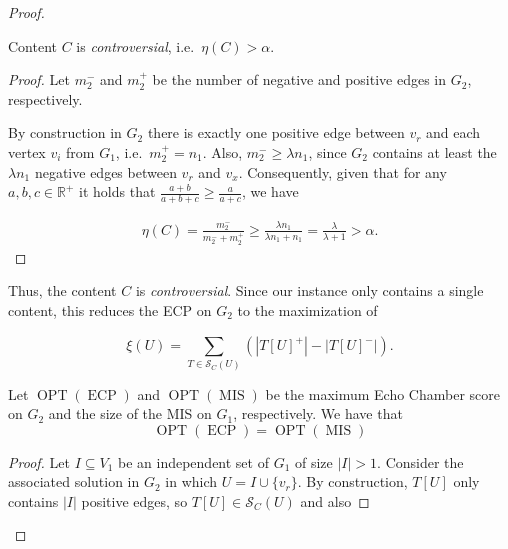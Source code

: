 \begin{proof}
	\begin{claim}
		\label{th:claim-controversial}
		Content $C$ is \emph{controversial}, i.e.\ $\eta(C) > \alpha $.
	\end{claim}
	\begin{proof}
		Let $m_{2}^{-} $ and $m_{2}^{+} $ be the number of negative and
		positive edges in $G_2$, respectively.

		By construction in $G_2$ there is exactly one
		positive edge between $v_r$ and each vertex $v_i$ from $ G_1$, i.e.\
		$m_{2}^{+} = n_{1} $. Also,
		$m_{2}^{-} \geq \lambda n_{1} $, since $G_2$ contains at least the $\lambda
			n_1$ negative edges between $v_r$ and $v_x$. Consequently, given
		that for any $a, b, c \in \mathbb{R}^{+}$ it holds that $\frac{a +
				b}{a + b + c} \geq \frac{a}{a + c} $, we have

		\begin{align}
			\eta(C) = \frac{m_{2}^{-} }{m_{2}^{-} +
				m_{2}^{+} } \geq \frac{\lambda n_{1}}{\lambda n_{1}
				+ n_{1} } = \frac{\lambda }{\lambda + 1} > \alpha.
		\end{align}
	\end{proof}

	Thus, the content $C$ is \emph{controversial}. Since our instance only contains
	a single content, this reduces the \acrshort{ECP} on $G_2$ to the maximization of

	\begin{equation}
		\label{eq:score}
		\xi(U) = \sum^{}_{T \in \mathcal{S}_C(U) } (| T[U]^{+} | - | T[U]^{-} |).
	\end{equation}

	\bigskip

	\begin{claim}
		\label{th:opt-equality}
		Let $\operatorname{OPT}(\operatorname{ECP})$ and
		$\operatorname{OPT}(\operatorname{MIS})$ be the maximum Echo Chamber score on
		$G_2$ and the size of the MIS on $G_1$, respectively.
		We have that
		\begin{equation}
			\operatorname{OPT}(\operatorname{ECP}) = \operatorname{OPT}(\operatorname{MIS})
		\end{equation}
	\end{claim}

	\begin{proof}
		Let $I \subseteq V_{1} $ be an independent set of $G_1$ of size $|I| >
			1$. Consider the associated solution in $G_2$ in which $U = I \cup
			\{v_{r} \}$. By construction, $T[U]$ only contains $|I|$ positive
		edges, so $T[U] \in \mathcal{S}_C(U)$ and also


\end{proof}
\end{proof}
